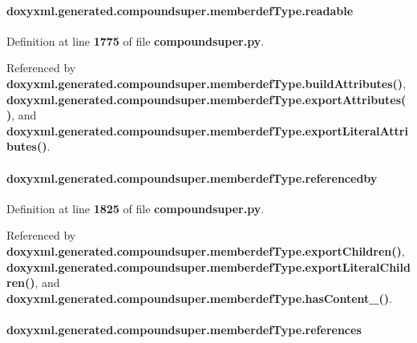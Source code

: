 \paragraph[{readable}]{\setlength{\rightskip}{0pt plus 5cm}doxyxml.\+generated.\+compoundsuper.\+memberdef\+Type.\+readable}\label{classdoxyxml_1_1generated_1_1compoundsuper_1_1memberdefType_aa9d993336a065fea7973b6510fe9b04b}


Definition at line {\bf 1775} of file {\bf compoundsuper.\+py}.



Referenced by {\bf doxyxml.\+generated.\+compoundsuper.\+memberdef\+Type.\+build\+Attributes()}, {\bf doxyxml.\+generated.\+compoundsuper.\+memberdef\+Type.\+export\+Attributes()}, and {\bf doxyxml.\+generated.\+compoundsuper.\+memberdef\+Type.\+export\+Literal\+Attributes()}.

\paragraph[{referencedby}]{\setlength{\rightskip}{0pt plus 5cm}doxyxml.\+generated.\+compoundsuper.\+memberdef\+Type.\+referencedby}\label{classdoxyxml_1_1generated_1_1compoundsuper_1_1memberdefType_a5e0f41de8765a7e6127b64400322f624}


Definition at line {\bf 1825} of file {\bf compoundsuper.\+py}.



Referenced by {\bf doxyxml.\+generated.\+compoundsuper.\+memberdef\+Type.\+export\+Children()}, {\bf doxyxml.\+generated.\+compoundsuper.\+memberdef\+Type.\+export\+Literal\+Children()}, and {\bf doxyxml.\+generated.\+compoundsuper.\+memberdef\+Type.\+has\+Content\+\_\+()}.

\paragraph[{references}]{\setlength{\rightskip}{0pt plus 5cm}doxyxml.\+generated.\+compoundsuper.\+memberdef\+Type.\+references}\label{classdoxyxml_1_1generated_1_1compoundsuper_1_1memberdefType_a9c42d3dcb7083638f0d737f80a73985f}


